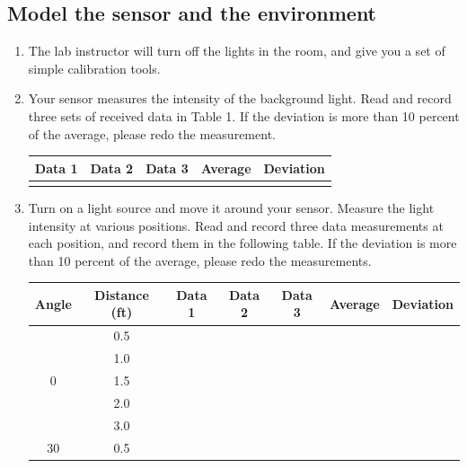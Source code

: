\documentclass[letterpaper,12pt]{article}
\begin{document}
\subsection*{Model the sensor and the environment}
\begin{enumerate}
    \item The lab instructor will turn off the lights in the room, and give you
        a set of simple calibration tools.
    \item Your sensor measures the intensity of the background light.
        Read and record three sets of received data in Table 1.
        If the deviation is more than 10 percent of the average,
        please redo the measurement.
        \begin{table}[H]
        \begin{center}
            \begin{tabular}{|c|c|c|c|c|}
                \hline
                \textbf{Data 1} & \textbf{Data 2} & \textbf{Data 3} & \textbf{Average} & \textbf{Deviation} \\ \hline
                 & & & & \\ \hline
            \end{tabular}
        \end{center}
        \end{table}
    \item Turn on a light source and move it around your sensor.
        Measure the light intensity at various positions. Read and record three
        data measurements at each position, and record them in the following table.
        If the deviation is more than 10 percent of the average, please redo
        the measurements.
        \begin{table}[H]
        \begin{center}
            \begin{tabular}{|c|c|c|c|c|c|c|}
                \hline
                \textbf{Angle} & \textbf{Distance (ft)} & \textbf{Data 1} & \textbf{Data 2} & \textbf{Data 3} & \textbf{Average} & \textbf{Deviation}\\ \hline
                \multirow{5}{*}{0} & 0.5 & & & & \\ \hline
                & 1.0 & & & & \\ \hline
                & 1.5 & & & & \\ \hline
                & 2.0 & & & & \\ \hline
                & 3.0 & & & & \\ \hline
                \multirow{5}{*}{30} & 0.5 & & & & \\ \hline

\end{tabular}
\end{center}
\end{table}
\end{enumerate}
\end{document}
